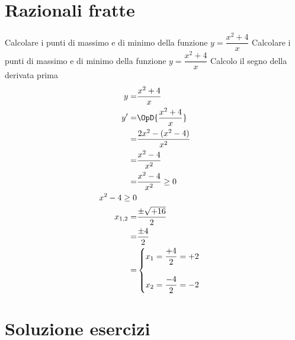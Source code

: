 \section{Razionali fratte}
\tcbstartrecording
\begin{exercise}
Calcolare i punti di massimo e di minimo della funzione $y=\dfrac{x^2+4}{x}$
	\tcblower
Calcolare i punti di massimo e di minimo della funzione $y=\dfrac{x^2+4}{x}$
Calcolo il segno della derivata prima
\begin{align*}
y=&\dfrac{x^2+4}{x}\\
y'=&\OpD{\dfrac{x^2+4}{x}}\\
=&\frac{2x^2-(x^2-4)}{x^{2}}\\
=&\frac{x^{2} - 4}{x^{2}}\\
=&\frac{x^{2} - 4}{x^{2}}\geq 0\\
x^2-4\geq 0\\
x_{1,2}=&\dfrac{\pm\sqrt{+16}}{2}\\
=&\dfrac{\pm 4}{2}\\
=&\begin{cases}
x_1=\dfrac{+4}{2}=+2\\
\\
x_2=\dfrac{-4}{2}=-2\\
\end{cases}
\end{align*}
\end{exercise}
\tcbstoprecording
\newpage
\section{Soluzione esercizi}
\tcbinputrecords
\newpage